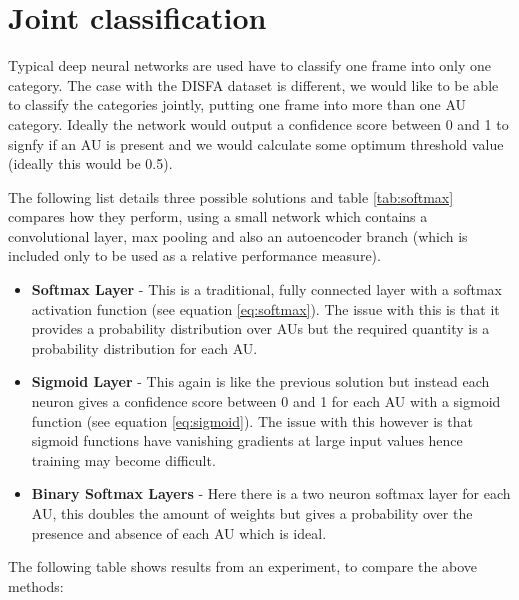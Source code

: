 \documentclass[11pt,twoside]{report}
\begin{document}
\section{Joint classification}

Typical deep neural networks are used have to classify
one frame into only one category. The case with the DISFA dataset is different, we
would like to be able to classify the categories jointly,  putting one frame into more than
one AU category. Ideally the network would output a confidence score between 0 and 1
to signfy if an AU is present and we would calculate some optimum threshold value
(ideally this would be 0.5).

The following list details three possible solutions and table \ref{tab:softmax}
compares how they perform, using a small network which contains a convolutional layer, max pooling and
also an autoencoder branch (which is included only to be used as a relative performance measure).

\begin{itemize}
  \item {\bf Softmax Layer} - This is a traditional, fully connected layer with
                              a softmax activation function (see equation \ref{eq:softmax}).
                              The issue with this is that it provides a probability distribution over AUs
                              but the required quantity is a probability distribution for each AU.
  \item {\bf Sigmoid Layer} - This again is like the previous solution but instead each neuron gives a confidence
                              score between 0 and 1 for each AU with a sigmoid function (see equation \ref{eq:sigmoid}).
                              The issue with this however is that sigmoid
                              functions have vanishing gradients at large input values
                              hence training may become difficult.
  \item {\bf Binary Softmax Layers} - Here there is a two neuron softmax layer
                                      for each AU, this doubles the amount of weights
                                      but gives a probability over the presence and
                                      absence of each AU which is ideal.
\end{itemize}

The following table shows results from an experiment, to compare the above methods:
\end{document}
